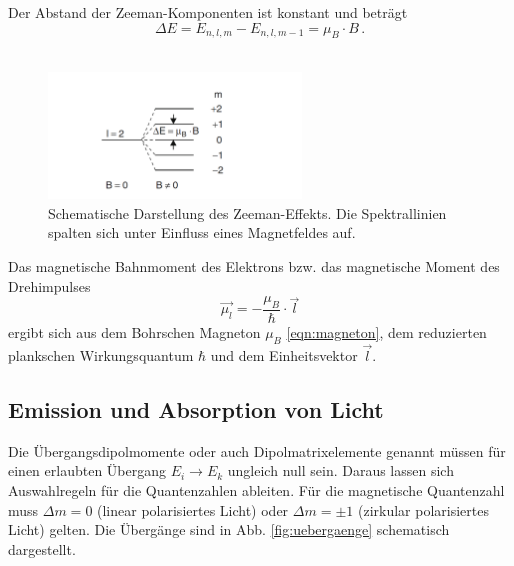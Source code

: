 Der Abstand der Zeeman-Komponenten ist konstant und beträgt
\begin{equation*}
    \Delta E = E_{n,l,m} - E_{n,l,m-1} = \mu_B \cdot B \, .
    \label{eqn:energie_dif_normal}
\end{equation*}
\\
\begin{figure}
    \centering
    \includegraphics[width=0.6\textwidth]{content/data/zeeman_aufspaltung.png}
    \caption{Schematische Darstellung des Zeeman-Effekts. Die Spektrallinien spalten sich unter Einfluss eines Magnetfeldes auf. \cite[150]{demtroeder}} %
    \label{fig:zeeman_aufspaltung}
\end{figure}
Das magnetische Bahnmoment des Elektrons bzw. das magnetische Moment des Drehimpulses
\begin{equation*}
    \vec{\mu_l} = -\frac{\mu_B}{\hbar} \cdot \vec{l}
    \label{eqn:magn_moment_l}
\end{equation*}
ergibt sich aus dem Bohrschen Magneton $\mu_B$ \eqref{eqn:magneton}, dem reduzierten plankschen Wirkungsquantum $\hbar$ und dem Einheitsvektor $\vec{l}$.
 
\subsection{Emission und Absorption von Licht}
Die Übergangsdipolmomente oder auch Dipolmatrixelemente genannt müssen für einen erlaubten Übergang $E_i \rightarrow E_k$ ungleich null sein.
Daraus lassen sich Auswahlregeln für die Quantenzahlen ableiten.
Für die magnetische Quantenzahl muss $\Delta m = 0$ (linear polarisiertes Licht) oder $\Delta m = \pm 1$ (zirkular polarisiertes Licht) gelten.
Die Übergänge sind in Abb. \ref{fig:uebergaenge} schematisch dargestellt.

